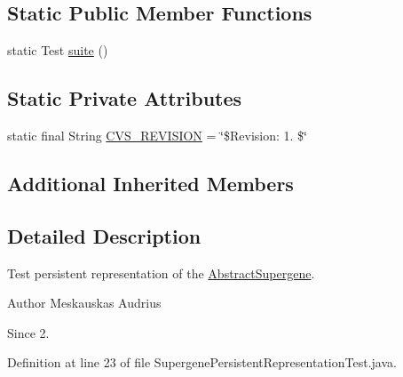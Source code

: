 \subsection*{Static Public Member Functions}
\begin{DoxyCompactItemize}
\item 
static Test \hyperlink{classorg_1_1jgap_1_1supergenes_1_1_supergene_persistent_representation_test_ada39b7ac35046e474353d101f76ba50f}{suite} ()
\end{DoxyCompactItemize}
\subsection*{Static Private Attributes}
\begin{DoxyCompactItemize}
\item 
static final String \hyperlink{classorg_1_1jgap_1_1supergenes_1_1_supergene_persistent_representation_test_a689a568da0af2810bb5ce29d3a4dc187}{C\-V\-S\-\_\-\-R\-E\-V\-I\-S\-I\-O\-N} = \char`\"{}\$Revision\-: 1. \$\char`\"{}
\end{DoxyCompactItemize}
\subsection*{Additional Inherited Members}


\subsection{Detailed Description}
Test persistent representation of the \hyperlink{classorg_1_1jgap_1_1supergenes_1_1_abstract_supergene}{Abstract\-Supergene}.

\begin{DoxyAuthor}{Author}
Meskauskas Audrius 
\end{DoxyAuthor}
\begin{DoxySince}{Since}
2. 
\end{DoxySince}


Definition at line 23 of file Supergene\-Persistent\-Representation\-Test.\-java.



